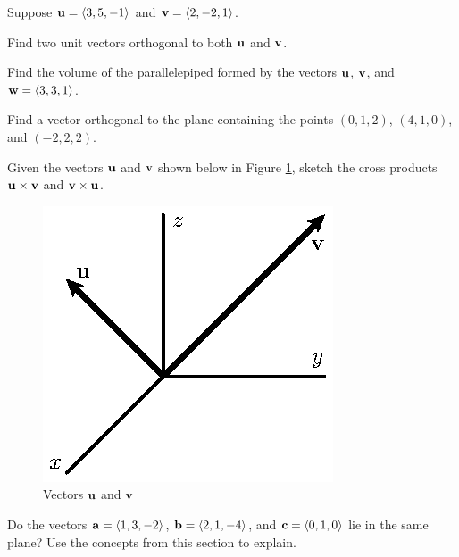 \begin{activity} \label{A:9.4.6}  Suppose 
  $\mathbf{u} = \langle 3, 5, -1\rangle$ and $\mathbf{v} = \langle 2, -2, 1\rangle$.

  \ba
  \item Find two unit vectors orthogonal to both $\mathbf{u}$ and $\mathbf{v}$.

  \item Find the volume of the parallelepiped formed by the
    vectors $\mathbf{u}$, $\mathbf{v}$, and $\mathbf{w} = \langle 3,3,1\rangle$.  
    
  \item Find a vector orthogonal to the plane containing the points
    $(0,1,2)$, $(4,1,0)$, and $(-2,2,2)$.

  \item Given the vectors
    $\mathbf{u}$ and $\mathbf{v}$ shown below in Figure \ref{F:9.4.activity.2},
    sketch the cross products $\mathbf{u}\times\mathbf{v}$ and $\mathbf{v}\times\mathbf{u}$.

    \begin{figure}[ht]
      \begin{center}
        \includegraphics{figures/fig_9_4_activity_2}
        \caption{Vectors $\mathbf{u}$ and $\mathbf{v}$}
        \label{F:9.4.activity.2}
      \end{center}
    \end{figure}

  \item Do the vectors $\mathbf{a} = \langle 1,3,-2\rangle$,
    $\mathbf{b}=\langle2,1,-4\rangle$, and $\mathbf{c}=\langle 0, 1, 0\rangle$ lie
    in the same plane?  Use the concepts from this section to explain.
    
    \ea
\end{activity}

